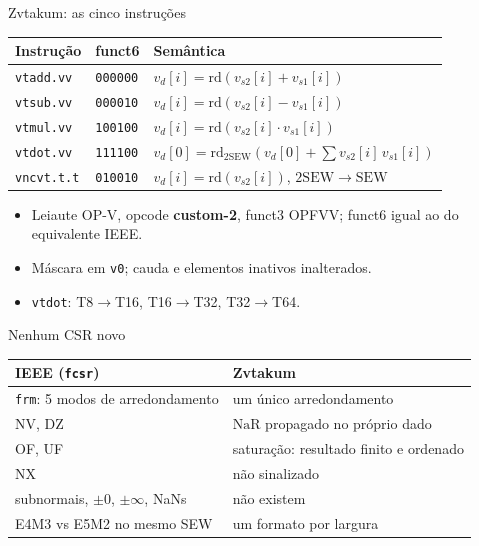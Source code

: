 \documentclass[aspectratio=169,10pt]{beamer}
\newcommand{\code}[1]{\texttt{#1}}
\newcommand{\NaR}{\mathrm{NaR}}
\begin{document}
\begin{frame}{Zvtakum: as cinco instruções}
\centering
\begin{tabular}{lll}
\toprule
Instrução & funct6 & Semântica\\
\midrule
\code{vtadd.vv} & \code{000000} & $v_d[i]=\mathrm{rd}(v_{s2}[i]+v_{s1}[i])$\\
\code{vtsub.vv} & \code{000010} & $v_d[i]=\mathrm{rd}(v_{s2}[i]-v_{s1}[i])$\\
\code{vtmul.vv} & \code{100100} & $v_d[i]=\mathrm{rd}(v_{s2}[i]\cdot v_{s1}[i])$\\
\code{vtdot.vv} & \code{111100} & $v_d[0]=\mathrm{rd}_{2\mathrm{SEW}}(v_d[0]+\sum v_{s2}[i]\,v_{s1}[i])$\\
\code{vncvt.t.t} & \code{010010} & $v_d[i]=\mathrm{rd}(v_{s2}[i])$, $2\mathrm{SEW}\to\mathrm{SEW}$\\
\bottomrule
\end{tabular}
\vspace{1em}
\begin{itemize}
\item Leiaute OP-V, opcode \textbf{custom-2}, funct3 OPFVV; funct6 igual ao do equivalente IEEE.
\item Máscara em \code{v0}; cauda e elementos inativos inalterados.
\item \code{vtdot}: T8$\to$T16, T16$\to$T32, T32$\to$T64.
\end{itemize}
\end{frame}

\begin{frame}{Nenhum CSR novo}
\centering
\begin{tabular}{ll}
\toprule
IEEE (\code{fcsr}) & Zvtakum\\
\midrule
\code{frm}: 5 modos de arredondamento & um único arredondamento\\
NV, DZ & $\NaR$ propagado no próprio dado\\
OF, UF & saturação: resultado finito e ordenado\\
NX & não sinalizado\\
subnormais, $\pm0$, $\pm\infty$, NaNs & não existem\\
E4M3 vs E5M2 no mesmo SEW & um formato por largura\\
\bottomrule
\end{tabular}
\end{frame}
\end{document}
